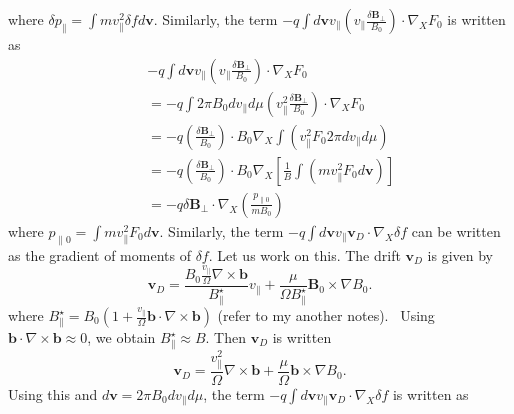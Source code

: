 \documentclass{llncs}
\begin{document}
where $\delta p_{\parallel} = \int m v_{\parallel}^2 \delta f d\mathbf{v}$.
Similarly, the term $- q \int d\mathbf{v}v_{\parallel} \left( v_{\parallel}
\frac{\delta \mathbf{B}_{\perp}}{B_0} \right) \cdot \nabla_X F_0$ is written
as
\begin{eqnarray}
  &  & - q \int d\mathbf{v}v_{\parallel} \left( v_{\parallel} \frac{\delta
  \mathbf{B}_{\perp}}{B_0} \right) \cdot \nabla_X F_0 \nonumber\\
  &  & = - q \int 2 \pi B_0 d v_{\parallel} d \mu \left( v_{\parallel}^2
  \frac{\delta \mathbf{B}_{\perp}}{B_0} \right) \cdot \nabla_X F_0 \nonumber\\
  &  & = - q \left( \frac{\delta \mathbf{B}_{\perp}}{B_0} \right) \cdot B_0
  \nabla_X \int (v_{\parallel}^2 F_0 2 \pi d v_{\parallel} d \mu) \nonumber\\
  &  & = - q \left( \frac{\delta \mathbf{B}_{\perp}}{B_0} \right) \cdot B_0
  \nabla_X \left[ \frac{1}{B} \int (m v_{\parallel}^2 F_0 d\mathbf{v}) \right]
  \nonumber\\
  &  & = - q \delta \mathbf{B}_{\perp} \cdot \nabla_X \left(
  \frac{p_{\parallel 0}}{m B_0} \right) 
\end{eqnarray}
where $p_{\parallel 0} = \int m v_{\parallel}^2 F_0 d\mathbf{v}$. Similarly,
the term $- q \int d\mathbf{v}v_{\parallel} \mathbf{v}_D \cdot \nabla_X \delta
f$ can be written as the gradient of moments of $\delta f$. Let us work on
this. The drift $\mathbf{v}_D$ is given by
\begin{equation}
  \mathbf{v}_D = \frac{B_0 \frac{v_{\parallel}}{\Omega} \nabla \times
  \mathbf{b}}{B^{\star}_{\parallel}} v_{\parallel} + \frac{\mu}{\Omega
  B^{\star}_{\parallel}} \mathbf{B}_0 \times \nabla B_0 .
\end{equation}
where $B^{\star}_{\parallel} = B_0 \left( 1 + \frac{v_{\parallel}}{\Omega}
\mathbf{b} \cdot \nabla \times \mathbf{b} \right)$ (refer to my another
notes). \ Using $\mathbf{b} \cdot \nabla \times \mathbf{b} \approx 0$, we
obtain $B^{\star}_{\parallel} \approx B$. Then $\mathbf{v}_D$ is written
\[ \mathbf{v}_D = \frac{v_{\parallel}^2}{\Omega} \nabla \times \mathbf{b}+
   \frac{\mu}{\Omega} \mathbf{b} \times \nabla B_0 . \]
Using this and $d\mathbf{v}= 2 \pi B_0 d v_{\parallel} d \mu$, the term $- q
\int d\mathbf{v}v_{\parallel} \mathbf{v}_D \cdot \nabla_X \delta f$ is written
as
\end{document}
